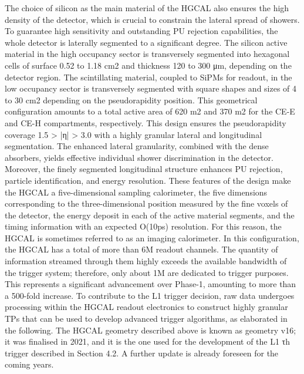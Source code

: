 The choice of silicon as the main material of the HGCAL also ensures the high density of the detector, which is crucial to constrain the lateral spread of showers. To guarantee high sensitivity and outstanding PU rejection capabilities, the whole detector is laterally segmented to a significant degree. The silicon active material in the high occupancy sector is transversely segmented into hexagonal cells of surface 0.52 to 1.18 cm2 and thickness 120 to 300 μm, depending on the detector region. The scintillating material, coupled to SiPMs for readout, in the low occupancy sector is transversely segmented with square shapes and sizes of 4 to 30 cm2 depending on the pseudorapidity position. This geometrical configuration amounts to a total active area of 620 m2 and 370 m2 for the CE-E and CE-H compartments, respectively.
This design ensures the pseudorapidity coverage 1.5 > |η| > 3.0 with a highly granular lateral and longitudinal segmentation. The enhanced lateral granularity, combined with the dense absorbers, yields effective individual shower discrimination in the detector. Moreover, the finely segmented longitudinal structure enhances PU rejection, particle identification, and energy resolution. These features of the design make the HGCAL a five-dimensional sampling calorimeter, the five dimensions corresponding to the three-dimensional position measured by the fine voxels of the detector, the energy deposit in each of the active material segments, and the timing information with an expected O(10ps) resolution. For this reason, the HGCAL is sometimes referred to as an imaging calorimeter.
In this configuration, the HGCAL has a total of more than 6M readout channels. The quantity of information streamed through them highly exceeds the available bandwidth of the trigger system; therefore, only about 1M are dedicated to trigger purposes. This represents a significant advancement over Phase-1, amounting to more than a 500-fold increase. To contribute to the L1 trigger decision, raw data undergoes processing within the HGCAL readout electronics to construct highly granular TPs that can be used to develop advanced trigger algorithms, as elaborated in the following.
The HGCAL geometry described above is known as geometry v16; it was finalised in 2021, and it is the one used for the development of the L1 τh trigger described in Section 4.2. A further update is already foreseen for the coming years.

